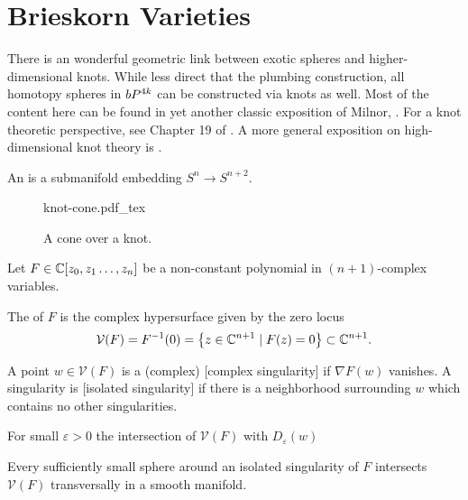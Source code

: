 \pagebreak
\newcommand{\V}{\mathcal{V}}
\renewcommand{\L}{\mathcal{L}}

\section{Brieskorn Varieties}\label{sec:brieskorn}

There is an wonderful geometric link between exotic spheres and higher-dimensional knots. While less direct that the plumbing construction, all homotopy spheres in $bP^{4k}$ can be constructed via knots as well. Most of the content here can be found in yet another classic exposition of Milnor, \cite{milnor1968hypersurfaces}. For a knot theoretic perspective, see Chapter 19 of \cite{kauffman1987knots}. A more general exposition on high-dimensional knot theory is \cite{ranicki1998knot}.

\begin{definition}
  An  is a submanifold embedding $S^n\to S^{n+2}$.
\end{definition}

\begin{figure}[ht]
  {knot-cone.pdf_tex}
  \caption{A cone over a knot.}\label{fig:cone-over-knot}
\end{figure}

Let $F\in \mathbb{C}[z_0,z_1\ldots, z_n]$ be a non-constant polynomial in $(n+1)$-complex variables.
\begin{definition}
	The  of $F$ is the complex hypersurface given by the zero locus
	\[
		\V(F) = F^{-1}(0)=\left\{ z \in \C^{n+1} \mid F(z)=0\right\} \subset \C^{n+1}.
	\]
\end{definition}

\begin{definition}
	A point $w\in \V(F)$ is a (complex) [complex singularity] if $\nabla F(w)$ vanishes. A singularity is [isolated singularity] if there is a neighborhood surrounding $w$ which contains no other singularities.
\end{definition}

\begin{theorem}
	For small $\varepsilon>0$ the intersection of $\V(F)$ with $D_\varepsilon(w)$
\end{theorem}

\begin{proposition}
	Every sufficiently small sphere around an isolated singularity of $F$ intersects $\V(F)$ transversally in a smooth manifold.
\end{proposition}

